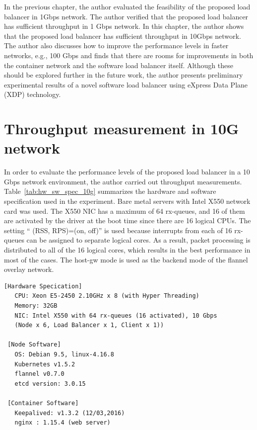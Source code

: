 In the previous chapter, the author evaluated the feasibility of the proposed load balancer in 1Gbps network.
The author verified that the proposed load balancer has sufficient throughput in 1 Gbps network.
In this chapter, the author shows that the proposed load balancer has sufficient throughput in 10Gbps network.
The author also discusses how to improve the performance levels in faster networks, e.g., 100 Gbps and finds that there are rooms for improvements in both the container network and the software load balancer itself.
Although these should be explored further in the future work, the author presents preliminary experimental results of a novel software load balancer using eXpress Data Plane (XDP) technology.



\section{Throughput measurement in 10G network}

In order to evaluate the performance levels of the proposed load balancer in a 10 Gbps network environment, the author carried out throughput measurements.
Table~\ref{tab:hw_sw_spec_10g} summarizes the hardware and software specification used in the experiment.
Bare metal servers with Intel X550 network card was used.
The X550 NIC has a maximum of 64 rx-queues, and 16 of them are activated by the driver at the boot time since there are 16 logical CPUs.
The setting \enquote{ (RSS, RPS)=(on, off)} is used because interrupts from each of 16 rx-queues can be assigned to separate logical cores.
As a result, packet processing is distributed to all of the 16 logical cores, which results in the best performance in most of the cases.
The host-gw mode is used as the backend mode of the flannel overlay network.

\begin{table}[h]
  \centering
  \begin{minipage}{0.9\columnwidth}
    \begin{lstlisting}[frame=lines,breaklines=true,basicstyle=\small\ttfamily]
 [Hardware Specication]
   CPU: Xeon E5-2450 2.10GHz x 8 (with Hyper Threading)
   Memory: 32GB
   NIC: Intel X550 with 64 rx-queues (16 activated), 10 Gbps
   (Node x 6, Load Balancer x 1, Client x 1))

 [Node Software]
   OS: Debian 9.5, linux-4.16.8
   Kubernetes v1.5.2
   flannel v0.7.0
   etcd version: 3.0.15

 [Container Software]
   Keepalived: v1.3.2 (12/03,2016)
   nginx : 1.15.4 (web server)
    \end{lstlisting}
  \end{minipage}

  \par\bigskip
  \centering
  \begin{minipage}{0.9\columnwidth}
    \caption[Hardware and software specifications for 10 Gbps experiment]{
      Hardware and software specifications for 10 Gbps experiment.
      There are 16 rx-queues activated for the NIC, to match the number of logical CPUs.
    }
    \label{tab:hw_sw_spec_10g}
  \end{minipage}
\end{table}

